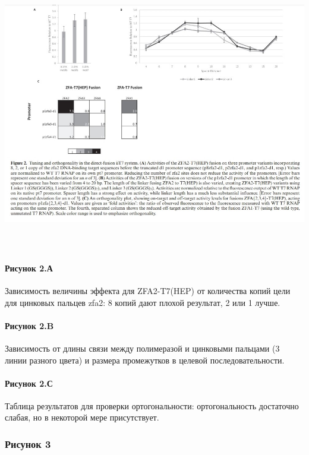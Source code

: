 \includegraphics[width=16cm, height=12cm]{Pictures/6_2}

\paragraph{Рисунок 2.А}

Зависимость величины эффекта для ZFA2-T7(HEP) от количества копий цели для цинковых пальцев zfa2: 8 копий дают плохой результат, 2 или 1 лучше.

\paragraph{Рисунок 2.B}

Зависимость от длины связи между полимеразой и цинковыми пальцами (3 линии разного цвета) и размера промежутков в целевой последовательности.


\paragraph{Рисунок 2.С}

Таблица результатов для проверки ортогональности: ортогональность достаточно слабая, но в некоторой мере присутствует.

\subsubsection{Рисунок 3}

